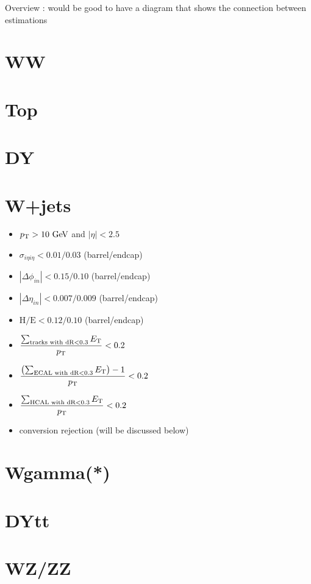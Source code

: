 Overview : would be good to have a diagram that shows the connection between estimations
\section{ WW }

\section{ Top }

\section{ DY }

\section{ W+jets } 
\label{sec:wjets}
\begin{itemize}
  \item $p_\mathrm{T}>10~\mathrm{Ge\kern -0.1em V}$ and $|\eta| < 2.5$
  \item $\sigma_{i\eta i\eta} < 0.01/0.03$ (barrel/endcap)
  \item $|\Delta\phi_{in}| < 0.15/0.10$ (barrel/endcap)
  \item $|\Delta\eta_{in}| < 0.007/0.009$ (barrel/endcap)
  \item $\textrm{H/E}< 0.12/0.10$ (barrel/endcap)
  \item $\displaystyle \frac{\sum_{\textrm{tracks with dR}<0.3}E_\mathrm{T}}{p_\mathrm{T}}<0.2$
  \item $\displaystyle \frac{\left(\sum_{\textrm{ECAL with dR}<0.3}E_\mathrm{T}\right)-1}{p_\mathrm{T}}<0.2$
  \item $\displaystyle \frac{\sum_{\textrm{HCAL with dR}<0.3}E_\mathrm{T}}{p_\mathrm{T}}<0.2$
  \item conversion rejection (will be discussed below)
\end{itemize}

\section{ Wgamma(*) }

\section{ DYtt }

\section{ WZ/ZZ }

